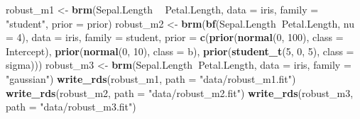 \documentclass[]{book}
\newenvironment{Shaded}{\begin{snugshade}}{\end{snugshade}}
\newcommand{\KeywordTok}[1]{\textcolor[rgb]{0.13,0.29,0.53}{\textbf{#1}}}
\newcommand{\DataTypeTok}[1]{\textcolor[rgb]{0.13,0.29,0.53}{#1}}
\newcommand{\DecValTok}[1]{\textcolor[rgb]{0.00,0.00,0.81}{#1}}
\newcommand{\StringTok}[1]{\textcolor[rgb]{0.31,0.60,0.02}{#1}}
\newcommand{\OperatorTok}[1]{\textcolor[rgb]{0.81,0.36,0.00}{\textbf{#1}}}
\newcommand{\NormalTok}[1]{#1}
\begin{document}
\begin{Shaded}
\begin{Highlighting}[]
\NormalTok{robust_m1 <-}\StringTok{ }\KeywordTok{brm}\NormalTok{(Sepal.Length }\OperatorTok{~}\StringTok{ }\NormalTok{Petal.Length, }
          \DataTypeTok{data =}\NormalTok{ iris, }
          \DataTypeTok{family =} \StringTok{"student"}\NormalTok{,}
          \DataTypeTok{prior =}\NormalTok{ prior)}
\NormalTok{robust_m2 <-}\StringTok{ }\KeywordTok{brm}\NormalTok{(}\KeywordTok{bf}\NormalTok{(Sepal.Length}\OperatorTok{~}\NormalTok{Petal.Length, }\DataTypeTok{nu =} \DecValTok{4}\NormalTok{),}
          \DataTypeTok{data =}\NormalTok{ iris, }
          \DataTypeTok{family =}\NormalTok{ student,}
          \DataTypeTok{prior =} \KeywordTok{c}\NormalTok{(}\KeywordTok{prior}\NormalTok{(}\KeywordTok{normal}\NormalTok{(}\DecValTok{0}\NormalTok{, }\DecValTok{100}\NormalTok{), }\DataTypeTok{class =}\NormalTok{ Intercept),}
                \KeywordTok{prior}\NormalTok{(}\KeywordTok{normal}\NormalTok{(}\DecValTok{0}\NormalTok{, }\DecValTok{10}\NormalTok{),  }\DataTypeTok{class =}\NormalTok{ b),}
                \KeywordTok{prior}\NormalTok{(}\KeywordTok{student_t}\NormalTok{(}\DecValTok{5}\NormalTok{, }\DecValTok{0}\NormalTok{, }\DecValTok{5}\NormalTok{),   }\DataTypeTok{class =}\NormalTok{ sigma)))}
\NormalTok{robust_m3 <-}\StringTok{ }\KeywordTok{brm}\NormalTok{(Sepal.Length}\OperatorTok{~}\NormalTok{Petal.Length, }
          \DataTypeTok{data =}\NormalTok{ iris, }
          \DataTypeTok{family =} \StringTok{"gaussian"}\NormalTok{)}
\KeywordTok{write_rds}\NormalTok{(robust_m1, }\DataTypeTok{path =} \StringTok{"data/robust_m1.fit"}\NormalTok{)}
\KeywordTok{write_rds}\NormalTok{(robust_m2, }\DataTypeTok{path =} \StringTok{"data/robust_m2.fit"}\NormalTok{)}
\KeywordTok{write_rds}\NormalTok{(robust_m3, }\DataTypeTok{path =} \StringTok{"data/robust_m3.fit"}\NormalTok{)}
\end{Highlighting}
\end{Shaded}
\end{document}

